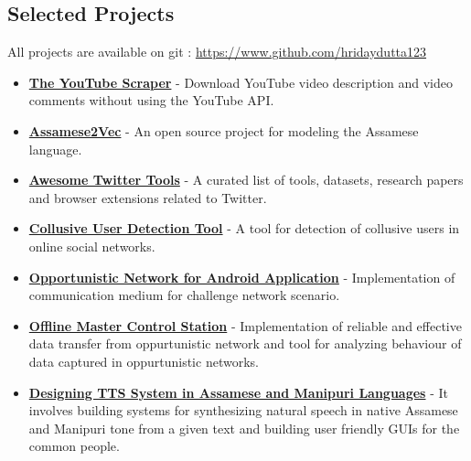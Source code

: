 \documentclass[margin, centered,lmodern]{res}
\begin{document}
\begin{resume}
\section{Selected Projects}
All projects are available on git : \url{https://www.github.com/hridaydutta123}
\begin{itemize}[leftmargin=*]
 \item \textbf{\href{https://github.com/hridaydutta123/the-youtube-scraper}{The YouTube Scraper}} - Download YouTube video description and video comments without using the YouTube API.

 \item \textbf{\href{https://github.com/hridaydutta123/Assamese2Vec}{Assamese2Vec}} - An open source project for modeling the Assamese language.

 \item \textbf{\href{https://github.com/hridaydutta123/awesome-twitter-tools}{Awesome Twitter Tools}} - A curated list of tools, datasets, research papers and browser extensions related to Twitter. 
 


 \item \textbf{\href{https://github.com/hridaydutta123/collusive-user-detection-tool}{Collusive User Detection Tool}} - A tool for detection of collusive users in online social networks.

 \item \textbf{\href{https://github.com/ItsForkIT/pdm}{Opportunistic Network for Android Application}} - Implementation of communication medium for challenge network scenario. 
 \item \textbf{\href{http://www.github.com/hridaydutta123/offlinemcs}{Offline Master Control Station}} - Implementation of reliable and effective data transfer from oppurtunistic network and tool for analyzing behaviour of data captured in oppurtunistic networks.
 \item \textbf{\href{http://www.iitg.ernet.in/cseweb/tts/tts/Assamese/}{Designing TTS System in Assamese and Manipuri Languages}} - It involves building systems for synthesizing natural speech in native Assamese and Manipuri tone from a given text and building user friendly GUIs for the common people.

\end{itemize}


\end{resume}
\end{document}
